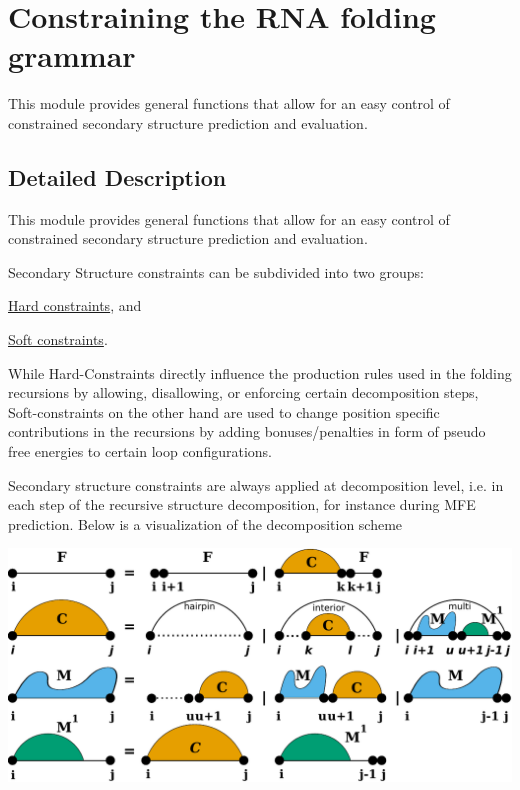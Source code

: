 \hypertarget{group__constraints}{}\section{Constraining the R\+NA folding grammar}
\label{group__constraints}


This module provides general functions that allow for an easy control of constrained secondary structure prediction and evaluation.  




\subsection{Detailed Description}
This module provides general functions that allow for an easy control of constrained secondary structure prediction and evaluation. 

Secondary Structure constraints can be subdivided into two groups\+:


\begin{DoxyItemize}
\item \hyperlink{group__hard__constraints}{Hard constraints}, and
\item \hyperlink{group__soft__constraints}{Soft constraints}.
\end{DoxyItemize}

While Hard-\/\+Constraints directly influence the production rules used in the folding recursions by allowing, disallowing, or enforcing certain decomposition steps, Soft-\/constraints on the other hand are used to change position specific contributions in the recursions by adding bonuses/penalties in form of pseudo free energies to certain loop configurations.

Secondary structure constraints are always applied at decomposition level, i.\+e. in each step of the recursive structure decomposition, for instance during M\+FE prediction. Below is a visualization of the decomposition scheme

 
\begin{DoxyImageNoCaption}
  \mbox{\includegraphics[width=\textwidth,height=\textheight/2,keepaspectratio=true]{recursions}}
\end{DoxyImageNoCaption}


